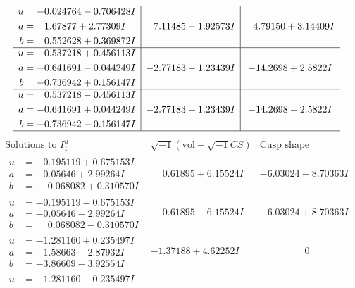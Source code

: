 \documentclass[1p]{elsarticle_modified}
\theoremstyle{definition}
\newcommand{\I}{\sqrt{-1}}
\begin{document}
$$\begin{array}{c|c|c}
\begin{aligned}
u &= -0.024764 - 0.706428 I \\
a &= \phantom{-}1.67877 + 2.77309 I \\
b &= \phantom{-}0.552628 + 0.369872 I\end{aligned}
 & \phantom{-}7.11485 - 1.92573 I & \phantom{-}4.79150 + 3.14409 I \\ \hline\begin{aligned}
u &= \phantom{-}0.537218 + 0.456113 I \\
a &= -0.641691 - 0.044249 I \\
b &= -0.736942 + 0.156147 I\end{aligned}
 & -2.77183 - 1.23439 I & -14.2698 + 2.5822 I \\ \hline\begin{aligned}
u &= \phantom{-}0.537218 - 0.456113 I \\
a &= -0.641691 + 0.044249 I \\
b &= -0.736942 - 0.156147 I\end{aligned}
 & -2.77183 + 1.23439 I & -14.2698 - 2.5822 I\\
 \hline 
 \end{array}$$\newpage$$\begin{array}{c|c|c}  
\text{Solutions to }I^u_{1}& \I (\text{vol} + \sqrt{-1}CS) & \text{Cusp shape}\\
 \hline 
\begin{aligned}
u &= -0.195119 + 0.675153 I \\
a &= -0.05646 + 2.99264 I \\
b &= \phantom{-}0.068082 + 0.310570 I\end{aligned}
 & \phantom{-}0.61895 + 6.15524 I & -6.03024 - 8.70363 I \\ \hline\begin{aligned}
u &= -0.195119 - 0.675153 I \\
a &= -0.05646 - 2.99264 I \\
b &= \phantom{-}0.068082 - 0.310570 I\end{aligned}
 & \phantom{-}0.61895 - 6.15524 I & -6.03024 + 8.70363 I \\ \hline\begin{aligned}
u &= -1.281160 + 0.235497 I \\
a &= -1.58663 - 2.87932 I \\
b &= -3.86609 - 3.92554 I\end{aligned}
 & -1.37188 + 4.62252 I & \phantom{-0.000000 } 0 \\ \hline\begin{aligned}
u &= -1.281160 - 0.235497 I \\

\end{aligned}
\end{array}$$
\end{document}
